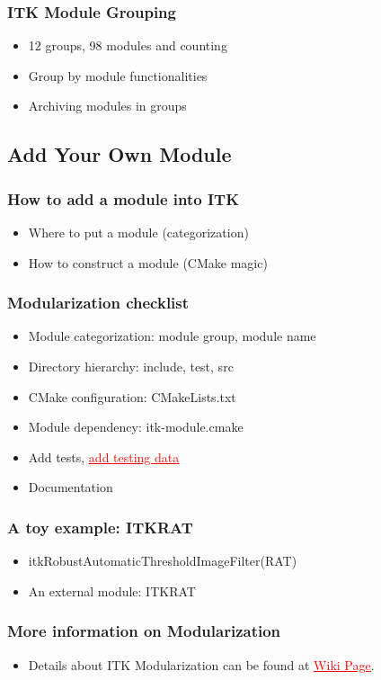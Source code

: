 \begin{frame}
\frametitle{ITK Module Grouping}
\begin{itemize}
\item  12 groups, 98 modules and counting
\pause
\item  Group by module functionalities
\pause
\item  Archiving modules in groups
\pause
\end{itemize}
\end{frame}

\subsection{Add Your Own Module}

\begin{frame}
\frametitle{How to add a module into ITK}
\begin{itemize}
\item Where to put a module (categorization)
\pause
\item How to construct a module (CMake magic)
\end{itemize}
\end{frame}


\begin{frame}
\frametitle{Modularization checklist}
\begin{itemize}
\item  Module categorization: module group, module name
\pause
\item  Directory hierarchy: include, test, src
\pause
\item  CMake configuration: CMakeLists.txt
\pause
\item  Module dependency: itk-module.cmake
\pause
\item  Add tests, \href{http://www.vtk.org/Wiki/ITK/Git/Develop/Data\#Workflow}{\textcolor{red}{\underline{add testing data}}}
\pause
\item  Documentation
\end{itemize}
\end{frame}


\begin{frame}
\frametitle{A toy example: ITKRAT}
\begin{itemize}
\item  itkRobustAutomaticThresholdImageFilter(RAT)
\pause
\item  An external module: ITKRAT
\end{itemize}
\end{frame}


\begin{frame}
\frametitle{More information on Modularization}
\begin{itemize}
\item  Details about ITK Modularization can be found at \href{http://www.itk.org/Wiki/ITK\_Release\_4/Modularization}{\textcolor{red}{\underline{Wiki Page}}}.
\end{itemize}
\end{frame}
